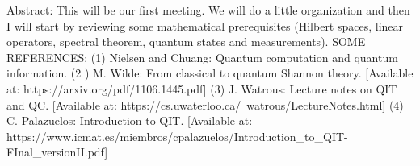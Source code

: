 

Abstract: This will be our first meeting. We will do a little organization and then I will start by reviewing some mathematical prerequisites (Hilbert spaces, linear operators, spectral theorem, quantum states and measurements). SOME REFERENCES: (1) Nielsen and Chuang: Quantum computation and quantum information. (2 ) M. Wilde: From classical to quantum Shannon theory. [Available at: https://arxiv.org/pdf/1106.1445.pdf] (3) J. Watrous: Lecture notes on QIT and QC. [Available at: https://cs.uwaterloo.ca/~watrous/LectureNotes.html] (4) C. Palazuelos: Introduction to QIT. [Available at: https://www.icmat.es/miembros/cpalazuelos/Introduction_to_QIT-FInal_versionII.pdf]


